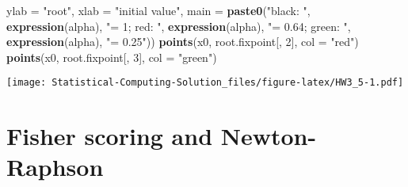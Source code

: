 \documentclass[]{book}
\newenvironment{Shaded}{\begin{snugshade}}{\end{snugshade}}
\newcommand{\KeywordTok}[1]{\textcolor[rgb]{0.13,0.29,0.53}{\textbf{#1}}}
\newcommand{\DataTypeTok}[1]{\textcolor[rgb]{0.13,0.29,0.53}{#1}}
\newcommand{\DecValTok}[1]{\textcolor[rgb]{0.00,0.00,0.81}{#1}}
\newcommand{\StringTok}[1]{\textcolor[rgb]{0.31,0.60,0.02}{#1}}
\newcommand{\NormalTok}[1]{#1}
\theoremstyle{definition}
\theoremstyle{definition}
\theoremstyle{definition}
\theoremstyle{remark}
\begin{document}
\begin{Shaded}
\begin{Highlighting}[]
     \DataTypeTok{ylab =} \StringTok{"root"}\NormalTok{, }\DataTypeTok{xlab =} \StringTok{"initial value"}\NormalTok{, }
     \DataTypeTok{main =} \KeywordTok{paste0}\NormalTok{(}\StringTok{"black: "}\NormalTok{, }\KeywordTok{expression}\NormalTok{(alpha), }\StringTok{"= 1; red: "}\NormalTok{, }\KeywordTok{expression}\NormalTok{(alpha), }
     \StringTok{"= 0.64; green: "}\NormalTok{, }\KeywordTok{expression}\NormalTok{(alpha), }\StringTok{"= 0.25"}\NormalTok{))}
\KeywordTok{points}\NormalTok{(x0, root.fixpoint[, }\DecValTok{2}\NormalTok{], }\DataTypeTok{col =} \StringTok{"red"}\NormalTok{)}
\KeywordTok{points}\NormalTok{(x0, root.fixpoint[, }\DecValTok{3}\NormalTok{], }\DataTypeTok{col =} \StringTok{"green"}\NormalTok{)}
\end{Highlighting}
\end{Shaded}

\texttt{[image: Statistical-Computing-Solution\_files/figure-latex/HW3\_5-1.pdf]}

\section{Fisher scoring and
Newton-Raphson}\label{fisher-scoring-and-newton-raphson}
\end{document}

